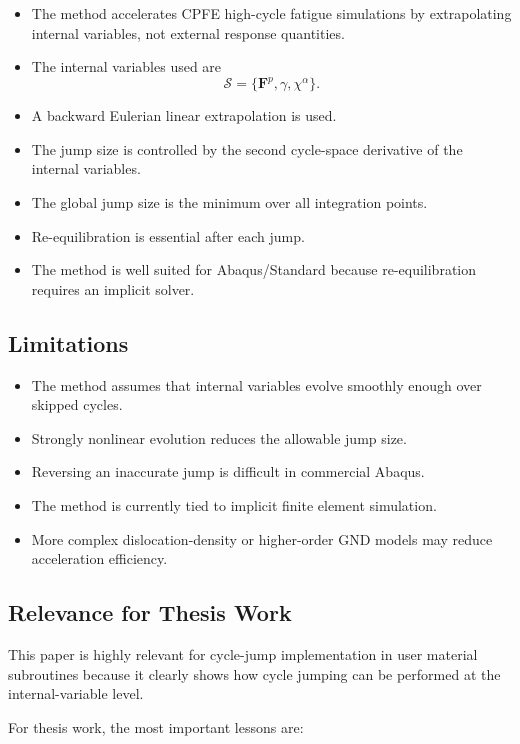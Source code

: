 ﻿\documentclass[11pt,a4paper]{article}
\begin{document}
\begin{itemize}[leftmargin=*]
    \item The method accelerates CPFE high-cycle fatigue simulations by extrapolating internal variables, not external response quantities.
    \item The internal variables used are
    \[
    \bm{\mathcal{S}}
    =
    \{\bm{F}^p,\gamma,\chi^\alpha\}.
    \]
    \item A backward Eulerian linear extrapolation is used.
    \item The jump size is controlled by the second cycle-space derivative of the internal variables.
    \item The global jump size is the minimum over all integration points.
    \item Re-equilibration is essential after each jump.
    \item The method is well suited for Abaqus/Standard because re-equilibration requires an implicit solver.
\end{itemize}

\subsection{Limitations}

\begin{itemize}[leftmargin=*]
    \item The method assumes that internal variables evolve smoothly enough over skipped cycles.
    \item Strongly nonlinear evolution reduces the allowable jump size.
    \item Reversing an inaccurate jump is difficult in commercial Abaqus.
    \item The method is currently tied to implicit finite element simulation.
    \item More complex dislocation-density or higher-order GND models may reduce acceleration efficiency.
\end{itemize}

\subsection{Relevance for Thesis Work}

This paper is highly relevant for cycle-jump implementation in user material subroutines because it clearly shows how cycle jumping can be performed at the internal-variable level.

For thesis work, the most important lessons are:
\end{document}
